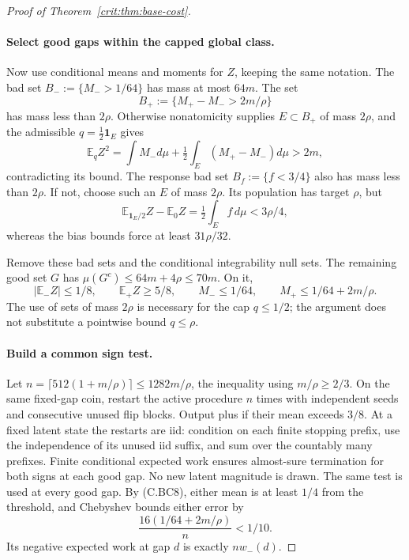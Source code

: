 \begin{proof}[Proof of Theorem~\ref{crit:thm:base-cost}]
\paragraph{Select good gaps within the capped global class.}
Now use conditional means and moments for $Z$, keeping the same notation.
The bad set $B_-:=\{M_->1/64\}$ has mass at most $64m$. The set
\[
                    B_+:=\{M_+-M_->2m/\rho\}
\]
has mass less than $2\rho$. Otherwise nonatomicity supplies
$E\subset B_+$ of mass $2\rho$, and the admissible
$q=\tfrac12\mathbf1_E$ gives
\[
 \mathbb E_qZ^2
 =\int M_-d\mu+\tfrac12\int_E(M_+-M_-)d\mu>2m,
\]
contradicting its bound. The response bad set
$B_f:=\{f<3/4\}$ also has mass less than $2\rho$. If not, choose such
an $E$ of mass $2\rho$. Its population has target $\rho$, but
\[
 \mathbb E_{\mathbf1_E/2}Z-\mathbb E_0Z
       =\tfrac12\int_E f\,d\mu<3\rho/4,
\]
whereas the bias bounds force at least $31\rho/32$.

Remove these bad sets and the conditional integrability null sets. The
remaining good set $G$ has
$\mu(G^c)\le64m+4\rho\le70m$. On it,
\[
 |\mathbb E_-Z|\le1/8,\qquad \mathbb E_+Z\ge5/8,
 \qquad M_-\le1/64,\qquad M_+\le1/64+2m/\rho.           \tag{C.BC8}
\]
The use of sets of mass $2\rho$ is necessary for the cap $q\le1/2$;
the argument does not substitute a pointwise bound $q\le\rho$.

\paragraph{Build a common sign test.}
Let $n=\lceil512(1+m/\rho)\rceil\le1282m/\rho$, the inequality using
$m/\rho\ge2/3$. On the same fixed-gap coin, restart the active procedure
$n$ times with independent seeds and consecutive unused flip blocks.
Output plus if their mean exceeds $3/8$. At a fixed latent state the
restarts are iid: condition on each finite stopping prefix, use the
independence of its unused iid suffix, and sum over the countably many
prefixes. Finite conditional expected work ensures almost-sure
termination for both signs at each good gap. No new latent magnitude is
drawn. The same test is used at every good gap. By (C.BC8), either mean is
at least $1/4$ from the threshold, and Chebyshev bounds either error by
\[
                 \frac{16(1/64+2m/\rho)}n<1/10.
\]
Its negative expected work at gap $d$ is exactly $nw_-(d)$.


\end{proof}
